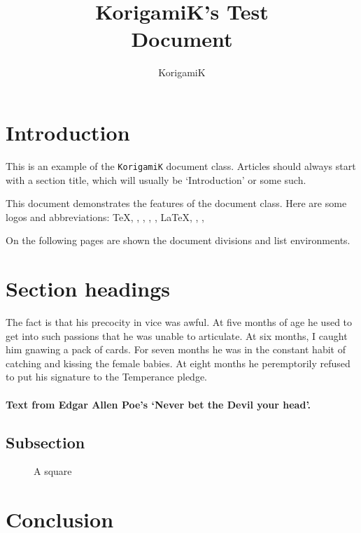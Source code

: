 \documentclass{korigamik}
\title{KorigamiK's Test\\ Document}
\author{KorigamiK}
\begin{document}
\maketitle

\tableofcontents

\section{Introduction}
This is an example of the \texttt{KorigamiK} document class.
Articles should always start with a section title, which will usually be `Introduction' or some such.

This document demonstrates the features of the document class.
Here are some logos and abbreviations:
\TeX, \pdfTeX, \BibTeX, \MF, \MP, \LaTeX, \LaTeXe,
\mbox{\ConTeXt}, \pdfLaTeX

On the following pages are shown the document divisions and list environments.

\section{Section headings}
The fact is that his precocity in vice was awful. At five months of age he
used to get into such passions that he was unable to articulate. At six
months, I caught him gnawing a pack of cards. For seven months he was in
the constant habit of catching and kissing the female babies. At eight
months he peremptorily refused to put his signature to the Temperance
pledge.
\paragraph{Text from Edgar Allen Poe's `Never bet the Devil your head'.}

\subsection{Subsection}
\lipsum[2]

\begin{figure}[htbp]
	\centering
	\square
	\caption{A square}
	\label{fig:square}
\end{figure}

\section{Conclusion}
\lipsum[3]
\end{document}
